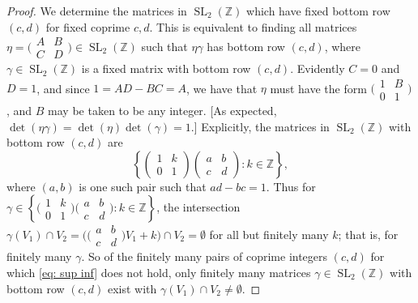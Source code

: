\documentclass[10pt,leqno]{article}
\newcommand{\cbr}[1]{\left\{#1\right\}}
\DeclareMathOperator{\SL}{SL}
\begin{document}
\begin{proof}
    We determine the matrices in $\SL_2(\mathbb{Z})$ which have fixed bottom row $(c,d)$ for fixed coprime $c,d$. This is equivalent to finding all matrices $\eta = \big(\!\begin{smallmatrix}
        A & B \\ C & D
    \end{smallmatrix}\!\big)\in \SL_2(\mathbb{Z})$ such that $\eta\gamma$ has bottom row $(c,d)$, where $\gamma\in \SL_2(\mathbb{Z})$ is a fixed matrix with  bottom row $(c,d)$. Evidently $C=0$ and $D = 1$, and since $1 = AD - BC = A$, we have that $\eta$ must have the form $\big(\!\begin{smallmatrix}
        1 & B \\ 0  & 1
    \end{smallmatrix}\!\big)$, and $B$ may be taken to be any integer. [As expected, $\det(\eta\gamma) = \det(\eta)\det(\gamma) = 1$.] Explicitly, the matrices in $\SL_2(\mathbb{Z})$ with bottom row $(c,d)$ are \[\cbr{\begin{pmatrix}
        1 & k \\ 0 & 1
    \end{pmatrix}\begin{pmatrix}
        a & b \\ c & d
    \end{pmatrix}: k\in \mathbb{Z}},\]
    where $(a,b)$ is one such pair such that $ad-bc = 1$. Thus for $\gamma\in \cbr{\big(\!\begin{smallmatrix}
        1 & k \\ 0 & 1
    \end{smallmatrix}\!\big)\big(\!\begin{smallmatrix}
        a & b \\ c & d
    \end{smallmatrix}\!\big): k\in \mathbb{Z}}$, the intersection $\gamma(V_1)\cap V_2 = \big(\big(\!\begin{smallmatrix}
        a & b \\ c & d
    \end{smallmatrix}\!\big)V_1+ k\big)\cap V_2 =\emptyset$ for all but finitely many $k$; that is, for finitely many $\gamma$. So of the finitely many pairs of coprime integers $(c,d)$ for which \cref{eq: sup inf} does not hold, only finitely many matrices $\gamma\in \SL_2(\mathbb{Z})$ with bottom row $(c,d)$ exist with $\gamma(V_1)\cap V_2\neq \emptyset$.


\end{proof}
\end{document}
